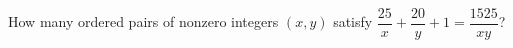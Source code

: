 How many ordered pairs of nonzero integers $(x,y)$ satisfy $\dfrac{25}{x}+\dfrac{20}{y}+1=\dfrac{1525}{xy}$?
